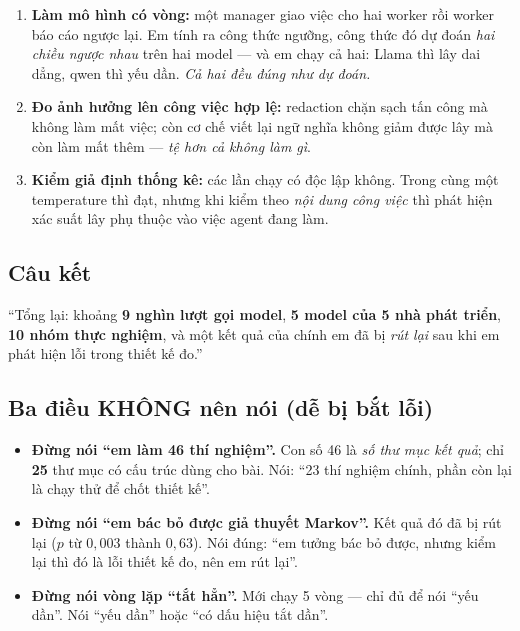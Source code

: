 \documentclass[11pt,a4paper]{article}
\newcommand{\nhan}[1]{\textbf{#1}}
\begin{document}
\begin{enumerate}
        \emph{phẳng}. Nên độ dốc của đường cong tự nó là cách chẩn đoán.
  \item \nhan{Làm mô hình có vòng:} một manager giao việc cho hai worker rồi worker báo
        cáo ngược lại. Em tính ra công thức ngưỡng, công thức đó dự đoán \emph{hai chiều
        ngược nhau} trên hai model --- và em chạy cả hai: Llama thì lây dai dẳng, qwen thì
        yếu dần. \emph{Cả hai đều đúng như dự đoán.}
  \item \nhan{Đo ảnh hưởng lên công việc hợp lệ:} redaction chặn sạch tấn công mà không
        làm mất việc; còn cơ chế viết lại ngữ nghĩa không giảm được lây mà còn làm mất
        thêm --- \emph{tệ hơn cả không làm gì}.
  \item \nhan{Kiểm giả định thống kê:} các lần chạy có độc lập không. Trong cùng một
        temperature thì đạt, nhưng khi kiểm theo \emph{nội dung công việc} thì phát hiện
        xác suất lây phụ thuộc vào việc agent đang làm.
\end{enumerate}

\subsection*{Câu kết}
``Tổng lại: khoảng \textbf{9 nghìn lượt gọi model}, \textbf{5 model của 5 nhà phát triển},
\textbf{10 nhóm thực nghiệm}, và một kết quả của chính em đã bị \emph{rút lại} sau khi em
phát hiện lỗi trong thiết kế đo.''

\subsection*{Ba điều KHÔNG nên nói (dễ bị bắt lỗi)}
\begin{itemize}
  \item \textbf{Đừng nói ``em làm 46 thí nghiệm''.} Con số 46 là \emph{số thư mục kết quả};
        chỉ \textbf{25} thư mục có cấu trúc dùng cho bài. Nói: ``23 thí nghiệm chính, phần
        còn lại là chạy thử để chốt thiết kế''.
  \item \textbf{Đừng nói ``em bác bỏ được giả thuyết Markov''.} Kết quả đó đã bị rút lại
        ($p$ từ $0{,}003$ thành $0{,}63$). Nói đúng: ``em tưởng bác bỏ được, nhưng kiểm lại
        thì đó là lỗi thiết kế đo, nên em rút lại''.
  \item \textbf{Đừng nói vòng lặp ``tắt hẳn''.} Mới chạy 5 vòng --- chỉ đủ để nói
        ``yếu dần''. Nói ``yếu dần'' hoặc ``có dấu hiệu tắt dần''.
\end{itemize}
\end{document}
